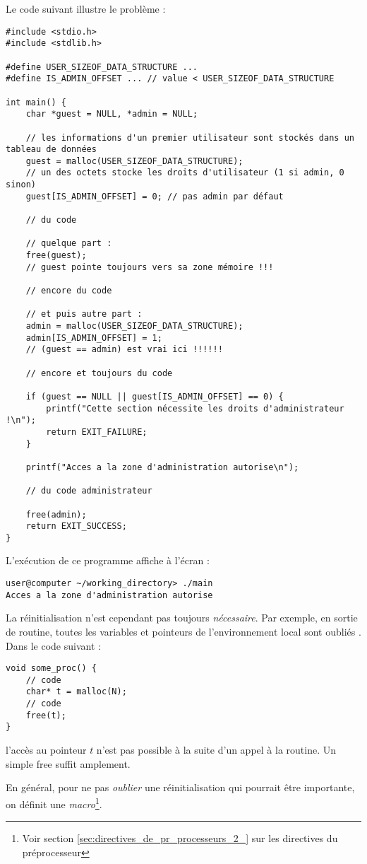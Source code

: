 \documentclass[../../../main.tex]{subfiles}
\begin{document}
Le code suivant illustre le problème :
\begin{verbatim}
#include <stdio.h>
#include <stdlib.h>

#define USER_SIZEOF_DATA_STRUCTURE ...
#define IS_ADMIN_OFFSET ... // value < USER_SIZEOF_DATA_STRUCTURE

int main() {
	char *guest = NULL, *admin = NULL;

	// les informations d'un premier utilisateur sont stockés dans un tableau de données
	guest = malloc(USER_SIZEOF_DATA_STRUCTURE);
	// un des octets stocke les droits d'utilisateur (1 si admin, 0 sinon)
	guest[IS_ADMIN_OFFSET] = 0; // pas admin par défaut

	// du code

	// quelque part :
	free(guest);
	// guest pointe toujours vers sa zone mémoire !!!

	// encore du code
	
	// et puis autre part :
	admin = malloc(USER_SIZEOF_DATA_STRUCTURE);
	admin[IS_ADMIN_OFFSET] = 1;
	// (guest == admin) est vrai ici !!!!!!

	// encore et toujours du code

	if (guest == NULL || guest[IS_ADMIN_OFFSET] == 0) {
		printf("Cette section nécessite les droits d'administrateur !\n");
		return EXIT_FAILURE;
	}
	
	printf("Acces a la zone d'administration autorise\n");

	// du code administrateur

	free(admin);
	return EXIT_SUCCESS;
}
\end{verbatim}
L'exécution de ce programme affiche à l'écran :
\begin{verbatim}
user@computer ~/working_directory> ./main
Acces a la zone d'administration autorise
\end{verbatim}
La réinitialisation n'est cependant pas toujours \textit{nécessaire}. Par exemple, en sortie de routine, toutes les variables et pointeurs de l'environnement local sont \og oubliés \fg. Dans le code suivant :
\begin{verbatim}
void some_proc() {
	// code
	char* t = malloc(N);
	// code
	free(t);
}
\end{verbatim}
l'accès au pointeur $t$ n'est pas possible à la suite d'un appel à la routine. Un simple \textsf{free} suffit amplement.

En général, pour ne pas \textit{oublier} une réinitialisation qui pourrait être importante, on définit une \textit{macro}\footnote{Voir section \ref{sec:directives_de_pr_processeurs_2_} sur les directives du préprocesseur}.
\end{document}
